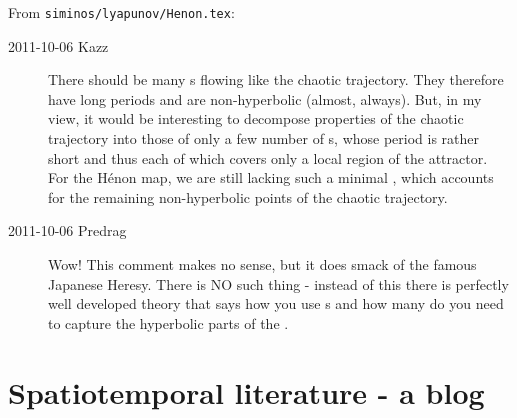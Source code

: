 From \texttt{siminos/lyapunov/Henon.tex}:
\begin{description}
\item[2011-10-06 Kazz]
There should be many \po s flowing like the chaotic trajectory. They
therefore have long periods and are non-hyperbolic (almost, always). But,
in my view, it would be interesting to decompose properties of the
chaotic trajectory into those of only a few number of \po s, whose period
is rather short and thus each of which covers only a local region of the
attractor. For the H\'enon map, we are still lacking such a minimal \po,
which accounts for the remaining non-hyperbolic points of the chaotic
trajectory.

\item[2011-10-06 Predrag]
Wow! This comment makes no sense, but it does smack of the famous
Japanese Heresy. There is NO such thing -
instead of this there is perfectly well developed theory that says how
you use \po s and how many do you need to capture the hyperbolic parts of
the {\nws}.
\end{description}

\section{Spatiotemporal literature - a blog}
\label{sect:SpatTempLit}


